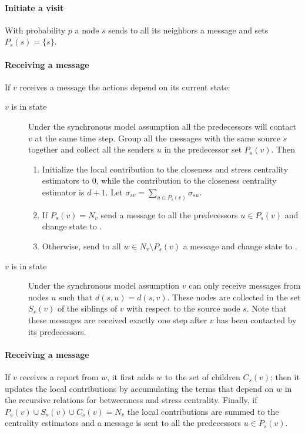 \paragraph{Initiate a visit} With probability $p$ a node $s$ sends to all its neighbors a  message and sets $P_s(s) = \{s\}$.

\paragraph{Receiving a  message} If $v$ receives a  message the actions depend on its current state:

\begin{description}

\item[$v$ is in state ] Under the synchronous model assumption all the predecessors will contact 
$v$ at the same time step. Group all the messages with the same source $s$ together and collect all the senders $u$ in the predecessor set $P_s(v)$. Then
\begin{enumerate}
\item Initialize the local contribution to the closeness and stress centrality estimators to $0$, while the contribution to the closeness centrality estimator is $d+1$. Let $\sigma_{sv} = \sum_{u \in P_s(v)} \sigma_{su}$.
\item If $P_s(v) = N_v$ send a  message to all the predecessors $u \in P_s(v)$ and change state to . 
\item Otherwise, send to all $w \in N_v \setminus P_s(v)$ a  message and change state to .
\end{enumerate}

\item[$v$ is in state ] Under the synchronous model assumption $v$ can only receive  messages from nodes $u$ such that $d(s,u) = d(s,v)$. These nodes are collected in the set $S_s(v)$ of the siblings of $v$ with respect to the source node $s$. Note that these messages are received exactly one step after $v$ has been contacted by its predecessors.

\end{description}

\paragraph{Receiving a \mrep{} message} If $v$ receives a report from $w$, it first adds $w$ to the set of children $C_s(v)$; then it updates the local contributions by accumulating the terms that depend on $w$ in the recursive relations for betweenness and stress centrality. Finally, if $P_s(v) \cup S_s(v) \cup C_s(v) = N_v$ the local contributions are summed to the centrality estimators and a  message is sent to all the predecessors $u \in P_s(v)$.